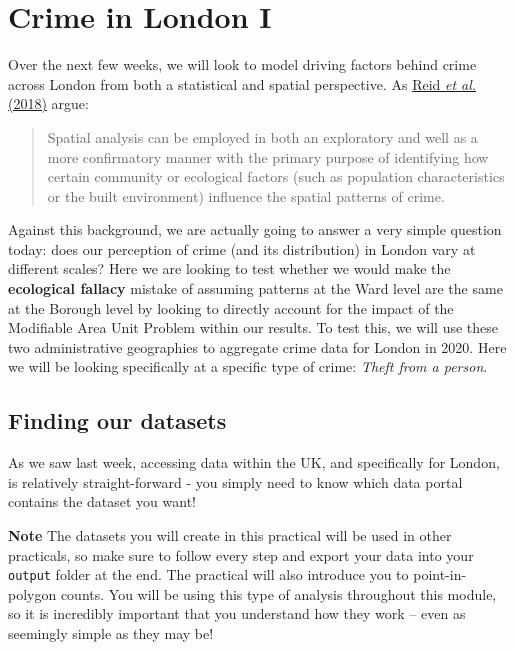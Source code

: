 \documentclass[
]{book}
\begin{document}
\hypertarget{crime-in-london-i}{%
\section{Crime in London I}\label{crime-in-london-i}}

Over the next few weeks, we will look to model driving factors behind crime across London from both a statistical and spatial perspective. As \href{https://www.oxfordbibliographies.com/view/document/obo-9780195396607/obo-9780195396607-0123.xml}{Reid \emph{et al.} (2018)} argue:

\begin{quote}
Spatial analysis can be employed in both an exploratory and well as a more confirmatory manner with the primary purpose of identifying how certain community or ecological factors (such as population characteristics or the built environment) influence the spatial patterns of crime.
\end{quote}

Against this background, we are actually going to answer a very simple question today: does our perception of crime (and its distribution) in London vary at different scales? Here we are looking to test whether we would make the \textbf{ecological fallacy} mistake of assuming patterns at the Ward level are the same at the Borough level by looking to directly account for the impact of the Modifiable Area Unit Problem within our results. To test this, we will use these two administrative geographies to aggregate crime data for London in 2020. Here we will be looking specifically at a specific type of crime: \emph{Theft from a person}.

\hypertarget{w03-finding}{%
\subsection{Finding our datasets}\label{w03-finding}}

As we saw last week, accessing data within the UK, and specifically for London, is relatively straight-forward - you simply need to know which data portal contains the dataset you want!

\textbf{Note}
The datasets you will create in this practical will be used in other practicals, so make sure to follow every step and export your data into your \texttt{output} folder at the end. The practical will also introduce you to point-in-polygon counts. You will be using this type of analysis throughout this module, so it is incredibly important that you understand how they work -- even as seemingly simple as they may be!
\end{document}
